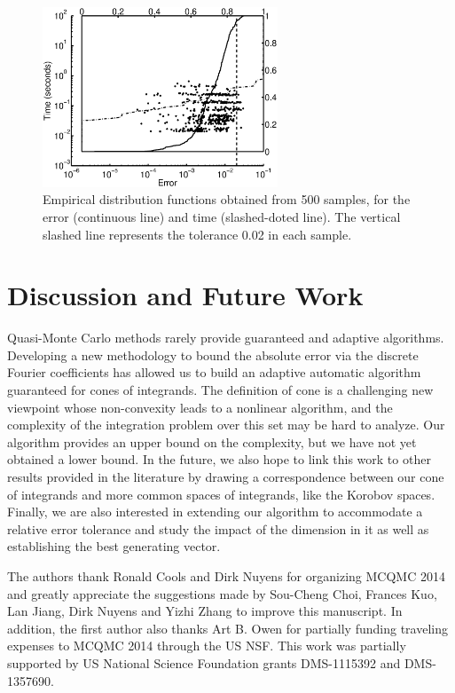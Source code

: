 \documentclass[graybox]{svmult}
\begin{document}
\begin{figure}[h!]
\centering
\includegraphics[width=7cm]{Images/geomeancubLatticeErrTime_d_64.eps} 
\caption{Empirical distribution functions obtained from 500 samples, for the error (continuous line) and time (slashed-doted line). The vertical slashed line represents the tolerance 0.02 in each sample. \label{geoAsianmean}}
\end{figure}

\section{Discussion and Future Work}
Quasi-Monte Carlo methods rarely provide guaranteed and adaptive algorithms. Developing a new methodology to bound the absolute error via the discrete Fourier coefficients has allowed us to build an adaptive automatic algorithm guaranteed for cones of integrands. The definition of cone is a challenging new viewpoint whose non-convexity leads to a nonlinear algorithm, and the complexity of the integration problem over this set may be hard to analyze. Our algorithm provides an upper bound on the complexity, but we have not yet obtained a  lower bound. In the future, we also hope to link this work to other results provided in the literature by drawing a correspondence between our cone of integrands and more common spaces of integrands, like the Korobov spaces. Finally, we are also interested in extending our algorithm to accommodate  a relative error tolerance and study the impact of the dimension in it as well as establishing the best generating vector.

\begin{acknowledgement}
The authors thank Ronald Cools and Dirk Nuyens for organizing MCQMC 2014 and greatly appreciate the suggestions made by Sou-Cheng Choi, Frances Kuo, Lan Jiang, Dirk Nuyens and Yizhi Zhang to improve this manuscript. In addition, the first author also thanks Art B. Owen for partially funding traveling expenses to MCQMC 2014 through the US NSF.
This work was partially supported by US National Science Foundation grants DMS-1115392 and DMS-1357690. 
\end{acknowledgement}



\end{document}
